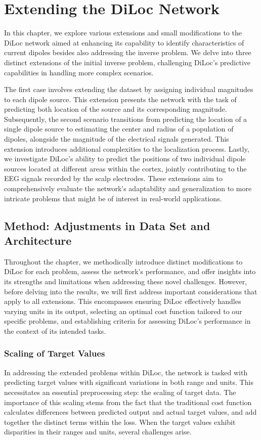 \documentclass[a4paper, UKenglish, 11pt]{uiomaster}
\begin{document}
\chapter{Extending the DiLoc Network}
In this chapter, we explore various extensions and small modifications to the DiLoc network aimed at enhancing its capability to identify characteristics of current dipoles besides also addressing the inverse problem. We delve into three distinct extensions of the initial inverse problem, challenging DiLoc's predictive capabilities in handling more complex scenarios.

The first case involves extending the dataset by assigning individual magnitudes to each dipole source. This extension presents the network with the task of predicting both location of the source and its corresponding magnitude. Subsequently, the second scenario transitions from predicting the location of a single dipole source to estimating the center and radius of a population of dipoles, alongside the magnitude of the electrical signals generated. This extension introduces additional complexities to the localization process. Lastly, we investigate DiLoc's ability to predict the positions of two individual dipole sources located at different areas within the cortex, jointly contributing to the EEG signals recorded by the scalp electrodes. These extensions aim to comprehensively evaluate the network's adaptability and generalization to more intricate problems that might be of interest in real-world applications.

\section{Method: Adjustments in Data Set and Architecture}
Throughout the chapter, we methodically introduce distinct modifications to DiLoc for each problem, assess the network's performance, and offer insights into its strengths and limitations when addressing these novel challenges. However, before delving into the results, we will first address important considerations that apply to all extensions. This encompasses ensuring DiLoc effectively handles varying units in its output, selecting an optimal cost function tailored to our specific problems, and establishing criteria for assessing DiLoc's performance in the context of its intended tasks.

\subsection{Scaling of Target Values}
In addressing the extended problems within DiLoc, the network is tasked with predicting target values with significant variations in both range and units. This necessitates an essential preprocessing step: the scaling of target data. The importance of this scaling stems from the fact that the traditional cost function calculates differences between predicted output and actual target values, and add together the distinct terms within the loss. When the target values exhibit disparities in their ranges and units, several challenges arise.
\end{document}
